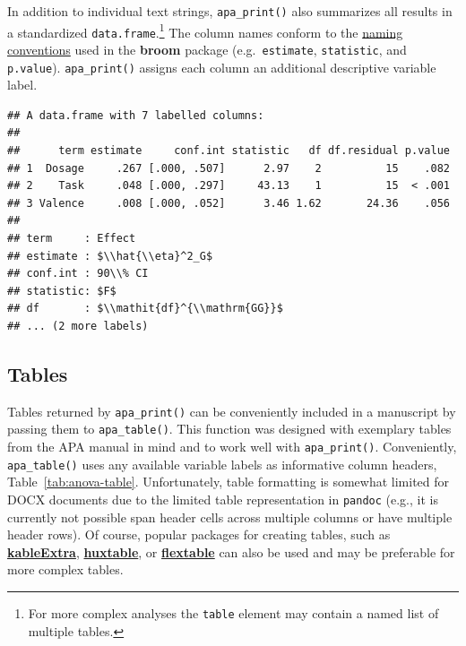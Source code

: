 \documentclass[
  ,man,floatsintext]{apa6}
\newenvironment{Shaded}{\begin{snugshade}}{\end{snugshade}}
\newcommand{\DecValTok}[1]{\textcolor[rgb]{0.00,0.00,0.81}{#1}}
\newcommand{\FunctionTok}[1]{\textcolor[rgb]{0.00,0.00,0.00}{#1}}
\newcommand{\NormalTok}[1]{#1}
\newcommand{\SpecialCharTok}[1]{\textcolor[rgb]{0.00,0.00,0.00}{#1}}
\begin{document}
In addition to individual text strings, \texttt{apa\_print()} also summarizes all results in a standardized \texttt{data.frame}.\footnote{For more complex analyses the \texttt{table} element may contain a named list of multiple tables.}
The column names conform to the \href{https://www.tidymodels.org/learn/develop/broom/\#glossary}{naming conventions} used in the \textbf{broom} package (e.g.~\texttt{estimate}, \texttt{statistic}, and \texttt{p.value}).
\texttt{apa\_print()} assigns each column an additional descriptive variable label.

\begin{Shaded}
\end{Shaded}

\begin{verbatim}
## A data.frame with 7 labelled columns:
## 
##      term estimate     conf.int statistic   df df.residual p.value
## 1  Dosage     .267 [.000, .507]      2.97    2          15    .082
## 2    Task     .048 [.000, .297]     43.13    1          15  < .001
## 3 Valence     .008 [.000, .052]      3.46 1.62       24.36    .056
## 
## term     : Effect 
## estimate : $\\hat{\\eta}^2_G$ 
## conf.int : 90\\% CI 
## statistic: $F$ 
## df       : $\\mathit{df}^{\\mathrm{GG}}$ 
## ... (2 more labels)
\end{verbatim}

\hypertarget{tables}{%
\subsection{Tables}\label{tables}}

Tables returned by \texttt{apa\_print()} can be conveniently included in a manuscript by passing them to \texttt{apa\_table()}.
This function was designed with exemplary tables from the APA manual in mind and to work well with \texttt{apa\_print()}.
Conveniently, \texttt{apa\_table()} uses any available variable labels as informative column headers, Table~\ref{tab:anova-table}.
Unfortunately, table formatting is somewhat limited for DOCX documents due to the limited table representation in \texttt{pandoc} (e.g., it is currently not possible span header cells across multiple columns or have multiple header rows).
Of course, popular packages for creating tables, such as \href{https://haozhu233.github.io/kableExtra/}{\textbf{kableExtra}}, \href{https://hughjonesd.github.io/huxtable/}{\textbf{huxtable}}, or \href{https://ardata-fr.github.io/flextable-book/index.html}{\textbf{flextable}} can also be used and may be preferable for more complex tables.
\end{document}
